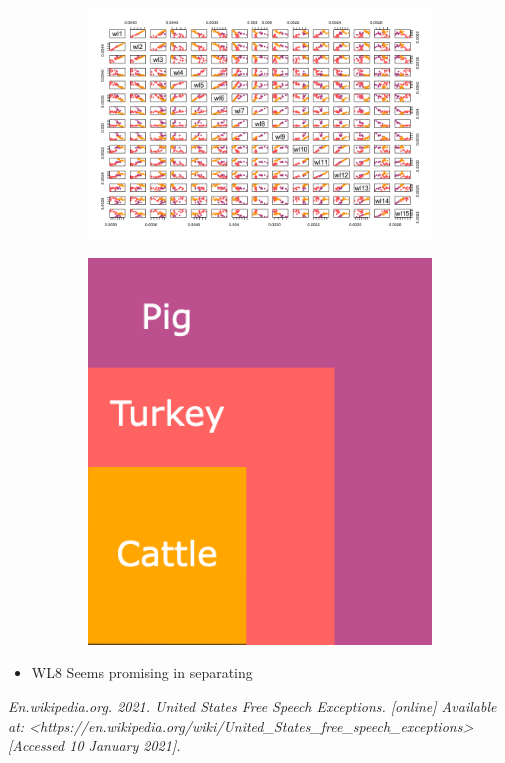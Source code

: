 \documentclass[openany]{article}
\begin{document}
	\begin{figure}[H]
		\begin{subfigure}{\textwidth}
			\centering
			\includegraphics[scale=0.3]{res/Spectroscopy-pairs}
		\end{subfigure}
		
		\begin{subfigure}{\textwidth}
			\centering
			\includegraphics[scale=0.3]{res/Color-Map}
		\end{subfigure}
	\end{figure}
	\begin{itemize}
		\item WL8 Seems promising in separating 
	\end{itemize}
	\pagebreak
	\begin{thebibliography}{1}	
		\textit{En.wikipedia.org. 2021. United States Free Speech Exceptions. [online] Available at: <https://en.wikipedia.org/wiki/United\_States\_free\_speech\_exceptions> [Accessed 10 January 2021].}
		
	\end{thebibliography}
\end{document}
